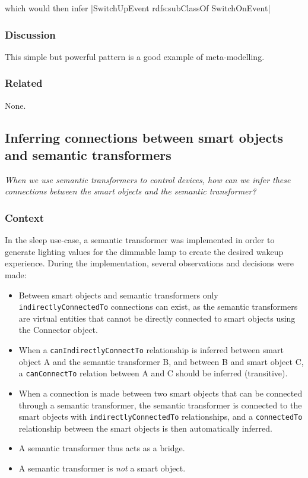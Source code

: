 which would then infer |SwitchUpEvent rdfs:subClassOf SwitchOnEvent|

\subsubsection{Discussion}

This simple but powerful pattern is a good example of meta-modelling.

\subsubsection{Related}

None.



\subsection{Inferring connections between smart objects and semantic transformers }

\emph{When we use semantic transformers to control devices, how can we infer these connections between the smart objects and the semantic transformer?}
\subsubsection{Context}

In the sleep use-case, a semantic transformer was implemented in order to generate lighting values for the dimmable lamp to create the desired wakeup experience. During the implementation, several observations and decisions were made:

\begin{itemize}
\item 	Between smart objects and semantic transformers only \texttt{indirectly\-ConnectedTo} connections can exist, as the semantic transformers are virtual entities that cannot be directly connected to smart objects using the Connector object.
\item 	When a \texttt{canIndirectlyConnectTo} relationship is inferred between smart object A and the semantic transformer B, and between B and smart object C, a \texttt{canConnectTo} relation between A and C should be inferred (transitive).
\item 	When a connection is made between two smart objects that can be connected through a semantic transformer, the semantic transformer is connected to the smart objects with \texttt{indirectly\-ConnectedTo} relationships, and a \texttt{connectedTo} relationship between the smart objects is then automatically inferred.
\item 	A semantic transformer thus acts as a bridge.
\item 	A semantic transformer is \emph{not} a smart object. 
\end{itemize}


